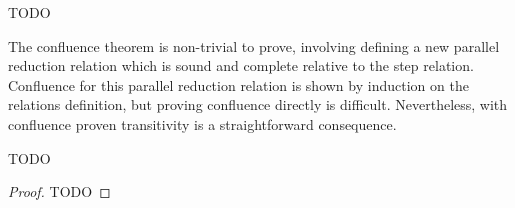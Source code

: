 \begin{theorem}[Confluence]
    TODO
\end{theorem}

The confluence theorem is non-trivial to prove, involving defining a new parallel reduction relation which is sound and complete relative to the step relation.
Confluence for this parallel reduction relation is shown by induction on the relations definition, but proving confluence directly is difficult.
Nevertheless, with confluence proven transitivity is a straightforward consequence.

\begin{theorem}
    TODO
\end{theorem}
\begin{proof}
    TODO
\end{proof}


